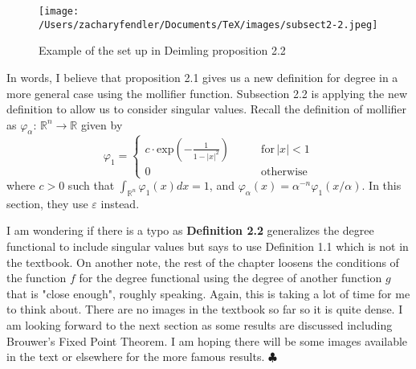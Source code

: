 \documentclass[reqno, 12pt]{article}
\newcommand{\R}{\mathbb{R}}
\newcommand{\END}{\hspace*{\fill} $\clubsuit$}
\begin{document}
\begin{figure}[h!]
	\centering
	\texttt{[image: /Users/zacharyfendler/Documents/TeX/images/subsect2-2.jpeg]}
	\caption{Example of the set up in Deimling proposition 2.2}
\end{figure}
In words, I believe that proposition 2.1 gives us a new definition for degree in a more general case using the mollifier function. Subsection 2.2 is applying the new definition to allow us to consider singular values. Recall the definition of mollifier as $\varphi_\alpha : \, \R^n \rightarrow \R$ given by 
$$\varphi_1 = \begin{cases}
	c\cdot \text{exp}\left(-\frac{1}{1- |x|^2}\right) \qquad &\text{for} \, |x| < 1 \\
	0 \qquad &\text{otherwise}
\end{cases}$$
where $c > 0$ such that $\int_{\R^n}\varphi_1(x) dx = 1$, and $\varphi_\alpha(x) = \alpha^{-n}\varphi_1(x/\alpha)$. In this section, they use $\varepsilon$ instead. 

I am wondering if there is a typo as \textbf{Definition 2.2} generalizes the degree functional to include singular values but says to use Definition 1.1 which is not in the textbook. On another note, the rest of the chapter loosens the conditions of the function $f$ for the degree functional using the degree of another function $g$ that is "close enough", roughly speaking. Again, this is taking a lot of time for me to think about. There are no images in the textbook so far so it is quite dense. I am looking forward to the next section as some results are discussed including Brouwer's Fixed Point Theorem. I am hoping there will be some images available in the text or elsewhere for the more famous results. \END
\end{document}
